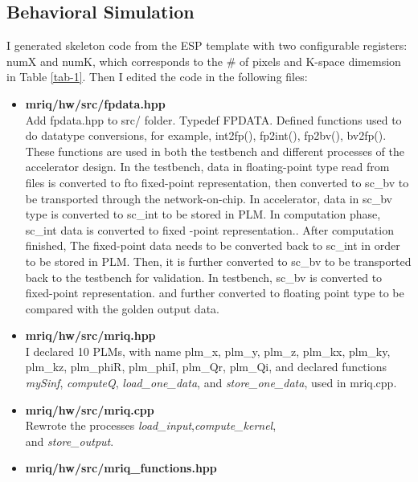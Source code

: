 \documentclass{sig-alternate}
\begin{document}
\subsection{Behavioral Simulation}
I generated skeleton code from the ESP template with two configurable registers: numX and numK, which corresponds to the \# of pixels and K-space dimemsion in Table \ref{tab-1}. Then I edited the code in the following files:\\
\vspace{-2mm}
\begin{itemize}[leftmargin=*]
\item \textbf{mriq/hw/src/fpdata.hpp}\\
    Add fpdata.hpp to src/ folder. Typedef FPDATA. Defined functions used to do datatype conversions, for example, int2fp(), fp2int(), fp2bv(), bv2fp(). These functions are used in both the testbench and different processes of the accelerator design. In the testbench, data in floating-point type read from files is converted to fto fixed-point representation, then converted to sc\_bv to be transported through the network-on-chip. In accelerator, data in sc\_bv  type is converted to sc\_int to be stored in PLM. In computation phase, sc\_int data is converted to fixed -point representation.. After computation finished, The fixed-point data needs to be converted back to sc\_int in order to be stored in PLM. Then, it is further converted to sc\_bv to be transported back to the testbench for validation. In testbench, sc\_bv is converted to fixed-point representation. and further converted to floating point type to be compared with the golden output data.
  \vspace{-2mm}
    \item \textbf{mriq/hw/src/mriq.hpp}\\
    I declared 10 PLMs, with name plm\_x, plm\_y, plm\_z, plm\_kx, plm\_ky, plm\_kz,  plm\_phiR, plm\_phiI, plm\_Qr,  plm\_Qi, and declared functions \textit{mySinf}, \textit{computeQ}, \textit{load\_one\_data}, and \textit{store\_one\_data}, used in mriq.cpp.
    \vspace{-2mm}
    \item \textbf{mriq/hw/src/mriq.cpp}\\
Rewrote the processes \textit{load\_input},\textit{compute\_kernel}, \\
and  \textit{store\_output}. 
    \vspace{-2mm}
\item \textbf{mriq/hw/src/mriq\_functions.hpp}\\

\end{itemize}
\end{document}
